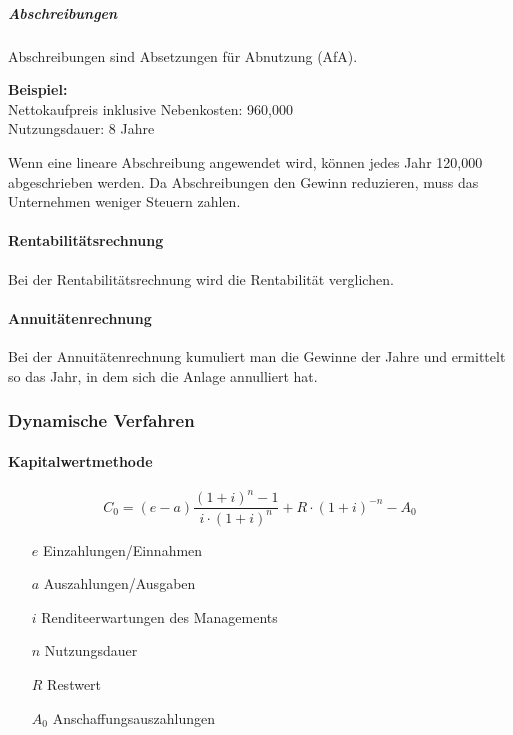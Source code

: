\documentclass[../main.tex]{subfiles}
\begin{document}
                    \subparagraph{Abschreibungen}
                        Abschreibungen sind Absetzungen für Abnutzung (AfA).
                        
                        \textbf{Beispiel:}\\
                        Nettokaufpreis inklusive Nebenkosten: 960,000\\
                        Nutzungsdauer: 8 Jahre
                        
                        Wenn eine lineare Abschreibung angewendet wird, können jedes Jahr 120,000 abgeschrieben werden. Da Abschreibungen den Gewinn reduzieren, muss das Unternehmen weniger Steuern zahlen.
                        
                \paragraph{Rentabilitätsrechnung}
                    Bei der Rentabilitätsrechnung wird die Rentabilität verglichen.
                    
                \paragraph{Annuitätenrechnung}
                    Bei der Annuitätenrechnung kumuliert man die Gewinne der Jahre und ermittelt so das Jahr, in dem sich die Anlage annulliert hat.
                    
            \subsubsection{Dynamische Verfahren}
                \paragraph{Kapitalwertmethode}
                    \begin{equation}
                        C_0 = \left(e - a\right)\frac{\left(1 + i\right)^n - 1}{i \cdot \left( 1 + i \right)^n} + R\cdot \left( 1 + i \right)^{-n} - A_0
                    \end{equation}
                    
                    \begin{itemize}
                        \item[$e$] Einzahlungen/Einnahmen
                        \item[$a$] Auszahlungen/Ausgaben
                        \item[$i$] Renditeerwartungen des Managements
                        \item[$n$] Nutzungsdauer
                        \item[$R$] Restwert
                        \item[$A_0$] Anschaffungsauszahlungen
                    \end{itemize}
                    
\end{document}
